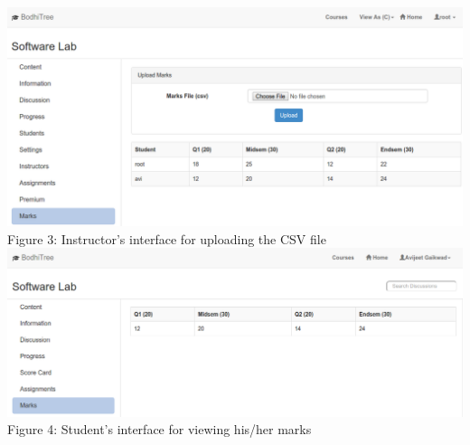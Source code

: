 \hspace*{-0.5in}
\begin{center}
\includegraphics[scale=0.4]{media/CDmarks.png} \\
\vspace{0.1in}
Figure 3: Instructor's interface for uploading the CSV file\\
\vspace{0.2in}
\includegraphics[scale=0.4]{media/Smarks.png} \\
\vspace{0.1in}
Figure 4: Student's interface for viewing his/her marks \\
\end{center}


